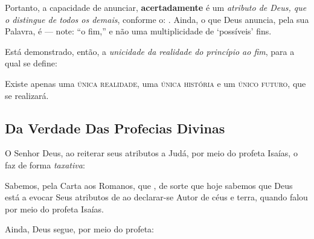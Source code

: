     Portanto, a capacidade de anunciar, \textbf{acertadamente}  é  um  \emph{atributo  de
    Deus, que o distingue de todos os demais}, conforme o: . Ainda, o  que  Deus  anuncia,
    pela sua Palavra, é  --- note: ``o fim,'' e não uma multiplicidade de `possíveis' fins.

    Está demonstrado, então, a \emph{unicidade da realidade do princípio ao fim}, para a qual se define:

    \begin{DEF}
        \label{def.pri.unicidade}
        Existe apenas uma \textsc{única realidade}, uma \textsc{única história} e um \textsc{único futuro},  que  se
        realizará.
    \end{DEF}


    \subsection{Da Verdade Das Profecias Divinas}

    O Senhor Deus, ao reiterar seus atributos a Judá, por meio do profeta Isaías, o faz de forma \emph{taxativa}:


    Sabemos, pela Carta aos Romanos, que , de sorte que hoje sabemos que Deus está a evocar Seus  atributos
    de  ao declarar-se Autor de céus e terra, quando falou por meio do
    profeta Isaías.

    Ainda, Deus segue, por meio do profeta:


